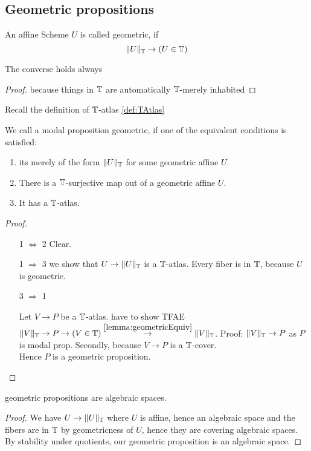 \subsection{Geometric propositions}
\begin{definition}
	An affine Scheme $U$ is called geometric, if 
	\[\|U\|_{\mathbb{T}} \to (U \in \mathbb{T})\]	
\end{definition}
\begin{lemma}{\label{lemma:geometricEquiv}}
	The converse holds always
\end{lemma}
\begin{proof}
	 because things in $\mathbb{T}$ are automatically $\mathbb{T}$-merely inhabited
\end{proof}
Recall the definition of $\mathbb{T}$-atlas \ref{def:TAtlas}
\begin{definition}{\label{def:algprop}}
	We call a modal proposition geometric, if one of the equivalent conditions is satisfied:
	\begin{enumerate}
		\item  its merely of the form $\|U\|_{\mathbb{T}}$ for some geometric affine $U$.
		\item There is a $\mathbb{T}$-surjective map out of a geometric affine $U$.
		\item It has a $\mathbb{T}$-atlas.
	\end{enumerate}

\end{definition}
\begin{proof} \
	\begin{enumerate}
		\item [1 $\Leftrightarrow$ 2]
		Clear.
		\item [1 $\Rightarrow$ 3]
			we show that $U \to \|U\|_{\mathbb{T}}$ is a $\mathbb{T}$-atlas. Every fiber is in $\mathbb{T}$, because $U$ is geometric.
		\item [3 $\Rightarrow$ 1]
		
				Let $V \to P$ be a $\mathbb{T}$-atlas.
		have to show TFAE $\|V\|_{\mathbb{T}} \to P \to (V \in \mathbb{T}) \overset{\ref{lemma:geometricEquiv}}{\to} \|V\|_{\mathbb{T}}$. 
		Proof: $\|V\|_{\mathbb{T}} \to P$ as $P$ is modal prop. Secondly, because $V \to P$ is a $\mathbb{T}$-cover. \\
		Hence $P$ is a geometric proposition.	
	\end{enumerate}

\end{proof}

\begin{lemma}
	geometric propositions are algebraic spaces.
\end{lemma}
\begin{proof}
	We have $U \to \|U\|_{\mathbb{T}}$ where $U$ is affine, hence an algebraic space and the fibers are in $\mathbb{T}$ by geometricness of $U$, hence they are covering algebraic spaces. By stability under quotients, our geometric proposition is an algebraic space.
\end{proof}
